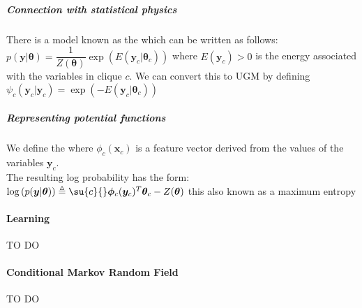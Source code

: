 \subparagraph{Connection with statistical physics}
There is a model known as the  which can be written as follows:
$p(\bm{y}|\bm{\theta}) = \dfrac{1}{Z(\bm{\theta})}\exp\left(E\left(\bm{y}_{c}|\bm{\theta}_{c}\right)\right)$
where $E(\bm{y}_{c})>0$ is the energy associated with the variables in clique $c$. We can convert 
this to UGM by defining $\psi_{c}(\bm{y}_{c}|\bm{y}_{c}) = \exp\left(-E(\bm{y}_{c}|\bm{\theta}_{c})\right)$

\subparagraph{Representing potential functions}
We define the  where
$\phi_{c}(\bm{x}_{c})$ is a feature vector derived from the values of the variables $\bm{y}_{c}$.\\
The resulting log probability has the form: 
$\log\left(p(\bm{y}|\bm{\theta})\right)\triangleq
\su{c}{}\bm{\phi}_{c}(\bm{y}_{c})^{T}\bm{\theta}_{c} - Z(\bm{\theta})$ this also known as a
maximum entropy

\paragraph{Learning}
TO DO

\paragraph{Conditional Markov Random Field}
TO DO
